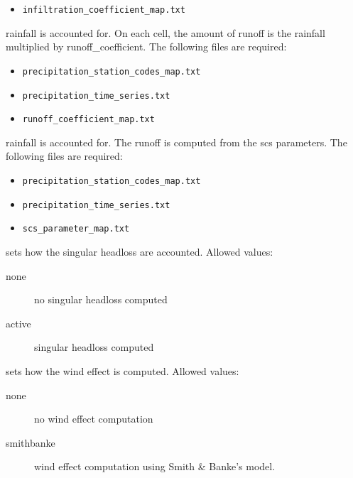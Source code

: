\begin{description}
\begin{description}
\begin{itemize}
    	\item \texttt{infiltration\_coefficient\_map.txt}
	\end{itemize}     
    \item[runoff\_coefficient] rainfall is accounted for. On each cell, the amount of runoff is the rainfall multiplied by runoff\_coefficient. The following files are required:
    \begin{itemize}
    	\item \texttt{precipitation\_station\_codes\_map.txt}
    	\item \texttt{precipitation\_time\_series.txt}
    	\item \texttt{runoff\_coefficient\_map.txt}
	\end{itemize}     
     \item[scs] rainfall is accounted for. The runoff is computed from the scs parameters. The following files are required:
    \begin{itemize}
    	\item \texttt{precipitation\_station\_codes\_map.txt}
    	\item \texttt{precipitation\_time\_series.txt}
    	\item \texttt{scs\_parameter\_map.txt}
\end{itemize}     

\end{description}

%


\item[model\_singular\_headloss] sets how the singular headloss are accounted. Allowed values:
\begin{description}
    \item[none] no singular headloss computed
     \item[active] singular headloss computed
\end{description}




\item[model\_wind] sets how the wind effect is computed. Allowed values:
\begin{description}
    \item[none] no wind effect computation
    \item[smithbanke] wind effect computation using Smith \& Banke's model.
\end{description}


\end{description}
